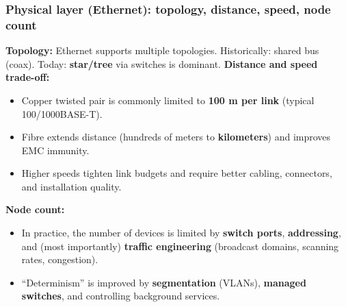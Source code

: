 \begin{frame}
	\frametitle{Physical layer (Ethernet): topology, distance, speed, node count}
	\small
	\textbf{Topology:} Ethernet supports multiple topologies.
	Historically: shared bus (coax). Today: \textbf{star/tree} via switches is dominant.
	\textbf{Distance and speed trade-off:}
	\begin{itemize}
		\item Copper twisted pair is commonly limited to \textbf{100 m per link} (typical 100/1000BASE-T).
		\item Fibre extends distance (hundreds of meters to \textbf{kilometers}) and improves EMC immunity.
		\item Higher speeds tighten link budgets and require better cabling, connectors, and installation quality.
	\end{itemize}
	\textbf{Node count:}
	\begin{itemize}
		\item In practice, the number of devices is limited by \textbf{switch ports}, \textbf{addressing},
			and (most importantly) \textbf{traffic engineering} (broadcast domains, scanning rates, congestion).
		\item ``Determinism'' is improved by \textbf{segmentation} (VLANs), \textbf{managed switches}, and
			controlling background services.
	\end{itemize}
\end{frame}

